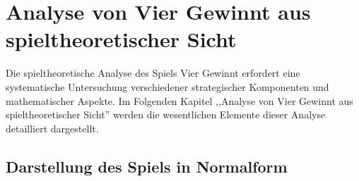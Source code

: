 \chapter{Analyse von Vier Gewinnt aus spieltheoretischer Sicht}

%

Die spieltheoretische Analyse des Spiels Vier Gewinnt erfordert eine systematische Untersuchung verschiedener strategischer Komponenten und mathematischer Aspekte. Im Folgenden Kapitel ,,Analyse von Vier Gewinnt aus spieltheoretischer Sicht'' werden die wesentlichen Elemente dieser Analyse detailliert dargestellt.
\section{Darstellung des Spiels in Normalform}
%


